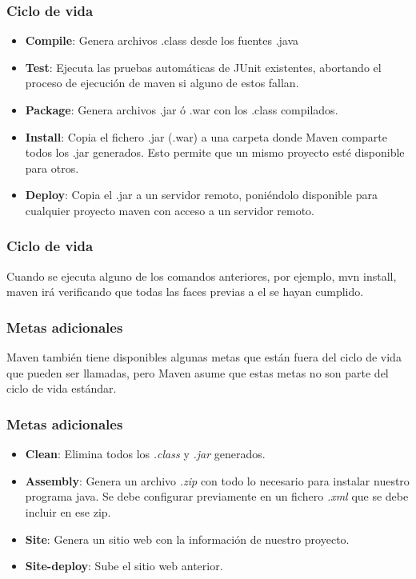 \documentclass{beamer}
\begin{document}
\begin{frame}
  \frametitle{Ciclo de vida}
  \begin{itemize}[<+->]
    \item \textbf{Compile}: Genera archivos .class desde los fuentes .java
    \item \textbf{Test}: Ejecuta las pruebas automáticas de JUnit existentes, abortando el
          proceso de ejecución de maven si alguno de estos fallan.
    \item \textbf{Package}: Genera archivos .jar ó .war con los .class compilados.
    \item \textbf{Install}: Copia el fichero .jar (.war) a una carpeta donde Maven comparte
          todos los .jar generados. Esto permite que un mismo proyecto esté
          disponible para otros.
    \item \textbf{Deploy}: Copia el .jar a un servidor remoto, poniéndolo disponible para
          cualquier proyecto maven con acceso a un servidor remoto.

   \end{itemize}

 \end{frame}

 \begin{frame}
   \frametitle{Ciclo de vida}
   Cuando se ejecuta alguno de los comandos anteriores, por ejemplo,
   mvn install, maven irá verificando que todas las faces previas a el se
   hayan cumplido.
 \end{frame}

 \begin{frame}
   \frametitle{Metas adicionales}

   Maven también tiene disponibles algunas metas que están fuera del ciclo de vida
   que pueden ser llamadas, pero Maven asume que estas metas no son parte del ciclo
   de vida estándar.

 \end{frame}

 \begin{frame}
   \frametitle{Metas adicionales}
   \begin{itemize}[<+->]
   \item \textbf{Clean}: Elimina todos los \textsl{.class} y \textsl{.jar} generados.
   \item \textbf{Assembly}: Genera un archivo \textsl{.zip} con todo lo necesario para instalar
     nuestro programa java. Se debe configurar previamente en un fichero \textsl{.xml}
     que se debe incluir en ese zip.
   \item \textbf{Site}: Genera un sitio web con la información de nuestro proyecto.
   \item \textbf{Site-deploy}: Sube el sitio web anterior.
   \end{itemize}
 \end{frame}
\end{document}
